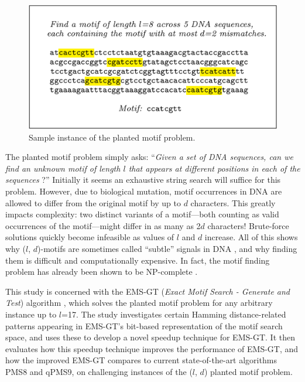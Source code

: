 \documentclass[oneside,12pt]{DISCSthesis}
\begin{document}
		\begin{figure}[h] \label{fig:example}
			\centering
			\includegraphics[width=5.5in]{img/example}
			\caption{Sample instance of the planted motif problem.}
			\end{figure}

		The planted motif problem simply asks: ``\emph{Given a set of DNA sequences, can we find an unknown motif of length $l$ that appears at different positions in each of the sequences} \cite{pevzner2000combinatorial}?'' Initially it seems an exhaustive string search will suffice for this problem. However, due to biological mutation, motif occurrences in DNA are allowed to differ from the original motif by up to $d$ characters. This greatly impacts complexity: two distinct variants of a motif---both counting as valid occurrences of the motif---might differ in as many as 2$d$ characters! Brute-force solutions quickly become infeasible as values of $l$ and $d$ increase. All of this shows why ($l$, $d$)-motifs are sometimes called ``subtle'' signals in DNA  \cite{pevzner2000combinatorial}, and why finding them is difficult and computationally expensive. In fact, the motif finding problem has already been shown to be NP-complete \cite{pms2014}. 

		This study is concerned with the EMS-GT (\emph{Exact Motif Search - Generate and Test}) algorithm \cite{nabos2015dissertation}, which solves the planted motif problem for any arbitrary instance up to $l$=17. The study investigates certain Hamming distance-related patterns appearing in EMS-GT's bit-based representation of the motif search space, and uses these to develop a novel speedup technique for EMS-GT. It then evaluates how this speedup technique improves the performance of EMS-GT, and how the improved EMS-GT compares to current state-of-the-art algorithms PMS8 and qPMS9, on challenging instances of the ($l$, $d$) planted motif problem.
		\newpage
\end{document}
